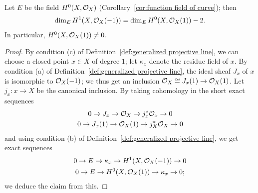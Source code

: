 \begin{lemma} \label{L:section of O1}
Let $E$ be the field $H^0(X, \mathcal{O}_X)$ (Corollary~\ref{cor:function field of curve});
then 
\[
\dim_E H^1(X, \mathcal{O}_X(-1)) = \dim_E H^0(X, \mathcal{O}_X(1)) - 2.
\]
In particular, $H^0(X, \mathcal{O}_X(1)) \neq 0$.
\end{lemma}
\begin{proof}
By condition (c) of Definition~\ref{def:generalized projective line}, we can choose a closed point $x \in X$ of degree $1$; let $\kappa_x$ denote the residue field of $x$.
By condition (a) of Definition~\ref{def:generalized projective line}, the ideal sheaf $J_x$ of $x$ is isomorphic to $\mathcal{O}_X(-1)$; we thus get an inclusion $\mathcal{O}_X \cong J_x(1) \to \mathcal{O}_X(1)$.
Let $j_x \colon x \to X$ be the canonical inclusion.
By taking cohomology in the short exact sequences
\begin{gather*}
0 \to J_x \to \mathcal{O}_X \to j_x^* \mathcal{O}_x \to 0 \\
0 \to J_x(1) \to \mathcal{O}_X(1) \to j_X^* \mathcal{O}_X \to 0
\end{gather*}
and using condition (b) of Definition~\ref{def:generalized projective line}, we get exact sequences
\begin{gather*}
0 \to E \to \kappa_x \to H^1(X, \mathcal{O}_X(-1)) \to 0 \\
0 \to E \to H^0(X, \mathcal{O}_X(1)) \to \kappa_x \to 0;
\end{gather*}
we deduce the claim from this.
\end{proof}

